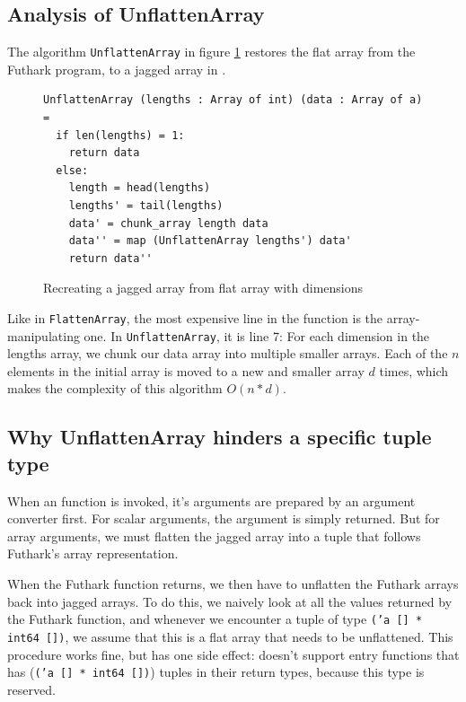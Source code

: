 \subsection{Analysis of UnflattenArray}
The algorithm \texttt{UnflattenArray} in figure \ref{fig:unflattenarray}
restores the flat array from the Futhark \csharp{} program, to a jagged array in \fsharp{}.

\begin{figure}[H]
  \centering
\begin{verbatim}
UnflattenArray (lengths : Array of int) (data : Array of a) =
  if len(lengths) = 1:
    return data
  else:
    length = head(lengths)
    lengths' = tail(lengths)
    data' = chunk_array length data 
    data'' = map (UnflattenArray lengths') data'
    return data''
\end{verbatim}
  \caption{Recreating a jagged array from flat array with dimensions}
  \label{fig:unflattenarray}
\end{figure}

Like in \texttt{FlattenArray}, the most expensive line in the function is the
array-manipulating one. In \texttt{UnflattenArray}, it is line 7: For each
dimension in the lengths array, we chunk our data array into multiple smaller
arrays. Each of the $n$ elements in the initial array is moved to a new and smaller array
$d$ times, which makes the complexity of this algorithm $O(n*d)$.

\subsection{Why UnflattenArray hinders a specific tuple type}
\label{subsec:hinderedtupletype}

When an \fshark{} function is invoked, it's arguments are prepared by an
argument converter first. For scalar arguments, the argument is simply returned.
But for array arguments, we must flatten the jagged array into a tuple that
follows Futhark's array representation.

When the Futhark function returns, we then have to unflatten the Futhark arrays
back into jagged arrays. To do this, we naively look at all the values
returned by the Futhark function, and whenever we encounter a tuple of type
\texttt{('a [] * int64 [])}, we assume that this is a flat array that needs to
be unflattened.
This procedure works fine, but has one side effect: \fshark{} doesn't support
entry functions that has (\texttt{('a [] * int64 [])}) tuples in their return
types, because this type is reserved.

